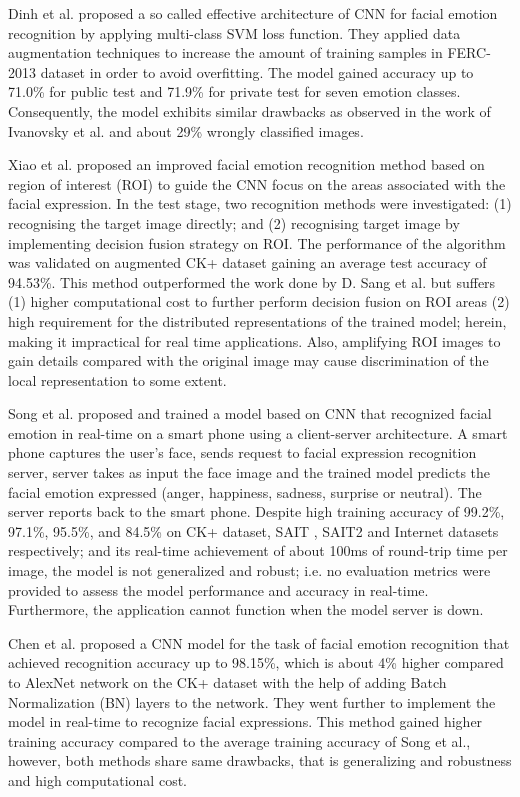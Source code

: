\documentclass[master]{thesis-uestc}
\begin{document}
Dinh et al.\cite{sang-2017} proposed a so called effective architecture of CNN for facial emotion recognition by applying multi-class SVM loss function. They applied data augmentation techniques to increase the amount of training samples in FERC-2013 dataset\cite{kaggle_ferc} in order to avoid overfitting. The model gained accuracy up to 71.0\% for public test and 71.9\% for private test for seven emotion classes. Consequently, the model exhibits similar drawbacks as observed in the work of Ivanovsky et al.\cite{Ivanovsky-2017} and about 29\% wrongly classified images.

Xiao et al.\cite{8273609} proposed an improved facial emotion recognition method based on region of interest (ROI) to guide the CNN focus on the areas associated with the facial expression. In the test stage, two recognition methods were investigated: (1) recognising the target image directly; and (2) recognising target image by implementing decision fusion strategy on ROI.  The performance of the algorithm was validated on augmented CK+ dataset gaining an average test accuracy of 94.53\%. This method outperformed the work done by D. Sang et al.\cite{sang-2017} but suffers (1) higher computational cost to further perform decision fusion on ROI areas (2) high requirement for the distributed representations of the trained model; herein, making it impractical for real time applications. Also, amplifying ROI images to gain details compared with the original image may cause discrimination of the local representation to some extent.

Song et al.\cite{6776135} proposed and trained a model based on CNN that recognized facial emotion in real-time on a smart phone using a client-server architecture. A smart phone captures the user's face, sends request to facial expression recognition server, server takes as input the face image and the trained model predicts the facial emotion expressed (anger, happiness, sadness, surprise or neutral). The server reports back to the smart phone. Despite high training accuracy of 99.2\%, 97.1\%, 95.5\%, and 84.5\% on CK+ dataset, SAIT , SAIT2  and Internet  datasets respectively; and its real-time achievement of about 100ms of round-trip time per image, the model is  not generalized and robust; i.e. no evaluation metrics were provided to assess the model performance and accuracy in real-time. Furthermore, the application cannot function when the model server is down.

Chen et al.\cite{7988558} proposed a CNN model for the task of facial emotion recognition that achieved recognition accuracy up to 98.15\%, which is about 4\% higher compared to AlexNet network on the CK+ dataset with the help of adding Batch Normalization (BN) layers to the network. They went further to implement the model in real-time to recognize facial expressions. This method gained higher training accuracy compared to the average training accuracy of Song et al.\cite{6776135}, however, both methods share same drawbacks, that is generalizing and robustness and high computational cost.
\end{document}
